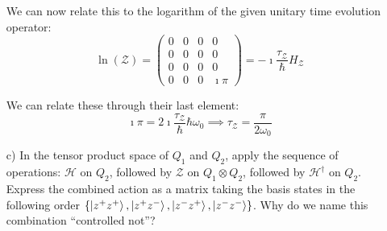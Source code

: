 \documentclass[a4paper,twoside]{article}
\begin{document}
\begin{itemize}
\begin{tcolorbox}[breakable]
    We can now relate this to the logarithm of the given unitary time evolution operator:
    \begin{equation}
        \ln(\mathcal{Z}) = \begin{pmatrix}0&0&0&0\\0&0&0&0\\0&0&0&0\\0&0&0&\imath\pi\end{pmatrix} = -\imath \frac{\tau_\mathcal{Z}}{\hbar}H_\mathcal{Z}
    \end{equation}
    
    We can relate these through their last element:
    \begin{equation}
        \imath\pi = 2\imath \frac{\tau_\mathcal{Z}}{\hbar} \hbar\omega_0 \implies\tau_\mathcal{Z} = \frac{\pi}{2\omega_0}
    \end{equation}
\end{tcolorbox}

    \item[c)] In the tensor product space of $Q_1$ and $ Q_2$, apply the sequence of operations: $\mathcal{H}$ on $Q_2$, followed by $\mathcal{Z}$ on $Q_1\otimes Q_2$, followed by $\mathcal{H}^\dagger$ on $Q_2$. Express the combined action as a matrix taking the basis states in the following order $\{\ket{z^+z^+},\ket{z^+z^-},\ket{z^-z^+},\ket{z^-z^-}\} $. Why do we name this combination “controlled not”?


\end{itemize}
\end{document}
